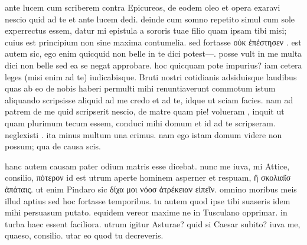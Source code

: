 


 ante lucem cum scriberem contra Epicureos, de eodem oleo et opera exaravi nescio quid ad te et ante lucem dedi. deinde cum somno repetito simul cum sole experrectus essem, datur mi epistula a sororis tuae filio quam ipsam tibi misi; cuius est principium non sine maxima contumelia. sed fortasse οὐκ ἐπέστησεν . est autem sic, ego enim quicquid non belle in te dici potest—. posse vult in me multa dici non belle sed ea se negat approbare. hoc quicquam pote impurius? iam cetera leges (misi enim ad te) iudicabisque. Bruti nostri cotidianis adsiduisque laudibus quas ab eo de nobis haberi permulti mihi renuntiaverunt commotum istum aliquando scripsisse aliquid ad me credo et ad te, idque ut sciam facies. nam ad patrem de me quid scripserit nescio, de matre quam pie! volueram , inquit ut quam plurimum tecum essem, conduci mihi domum et id ad te scripseram. neglexisti . ita minus multum una erimus. nam ego istam domum videre non possum; qua de causa scis.

 hanc autem causam pater odium matris esse dicebat. nunc me iuva, mi Attice, consilio, πότερον id est utrum aperte hominem asperner et respuam, ἢ σκολιαῖσ ἀπάταις. ut enim Pindaro sic δίχα μοι νόοσ ἀτρέκειαν εἰπεῖν. omnino moribus meis illud aptius sed hoc fortasse temporibus. tu autem quod ipse tibi suaseris idem mihi persuasum putato. equidem vereor maxime ne in Tusculano opprimar. in turba haec essent faciliora. utrum igitur Asturae? quid si Caesar subito? iuva me, quaeso, consilio. utar eo quod tu decreveris.
